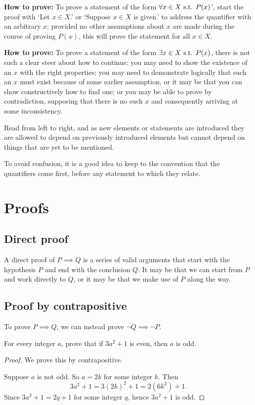 \textbf{How to prove:} To prove a statement of the form $\forall x \in X \text{ s.t. } P(x)$’, start the proof with ‘Let $x \in X$.’ or ‘Suppose $x \in X$ is given.’ to address the quantifier with an arbitrary $x$; provided no other assumptions about $x$ are made during the course of proving $P(x)$, this will prove the statement for all $x \in X$. 

\textbf{How to prove:} To prove a statement of the form $\exists x \in X \text{ s.t. } P(x)$, there is not such a clear steer about how to continue: you may need to show the existence of an $x$ with the right properties; you may need to demonstrate logically that such an $x$ must exist because of some earlier assumption, or it may be that you can show constructively how to find one; or you may be able to prove by contradiction, supposing that there is no such $x$ and consequently arriving at some inconsistency.

\begin{remark}
Read from left to right, and as new elements or statements are introduced they are allowed to depend on previously introduced elements but cannot depend on things that are yet to be mentioned.
\end{remark}

\begin{remark}
To avoid confusion, it is a good idea to keep to the convention that the quantifiers come first, before any statement to which they relate.
\end{remark}
\pagebreak

\section{Proofs}
\subsection{Direct proof}
A direct proof of $P \implies Q$ is a series of valid arguments that start with the hypothesis $P$ and end with the conclusion $Q$. It may be that we can start from $P$ and work directly to $Q$, or it may be that we make use of $P$ along the way.

\subsection{Proof by contrapositive}
To prove $P \implies Q$, we can instead prove $\lnot Q \implies \lnot P$.

\begin{exercise}{}{}
For every integer $a$, prove that if $3a^2+1$ is even, then $a$ is odd.
\end{exercise}
\begin{proof}
We prove this by contrapositive.

Suppose $a$ is not odd. So $a=2k$ for some integer $k$. Then
\[ 3a^2+1=3(2k)^2+1=2(6k^2)+1. \]
Since $3a^2+1=2q+1$ for some integer $q$, hence $3a^2+1$ is odd.
\end{proof}

